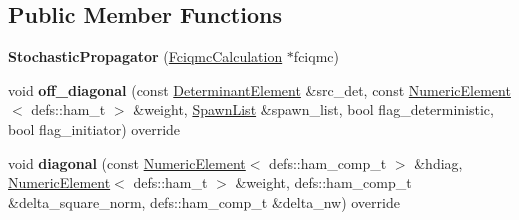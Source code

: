\subsection*{Public Member Functions}
\begin{DoxyCompactItemize}
\item 
{\bfseries Stochastic\+Propagator} (\hyperlink{classFciqmcCalculation}{Fciqmc\+Calculation} $\ast$fciqmc)\hypertarget{classStochasticPropagator_a8e047b2c7790401fba3ceac809c19c45}{}\label{classStochasticPropagator_a8e047b2c7790401fba3ceac809c19c45}

\item 
void {\bfseries off\+\_\+diagonal} (const \hyperlink{classDeterminantElement}{Determinant\+Element} \&src\+\_\+det, const \hyperlink{classNumericElement}{Numeric\+Element}$<$ defs\+::ham\+\_\+t $>$ \&weight, \hyperlink{structSpawnList}{Spawn\+List} \&spawn\+\_\+list, bool flag\+\_\+deterministic, bool flag\+\_\+initiator) override\hypertarget{classStochasticPropagator_ac6e8058f872699d0960ed6264be2511e}{}\label{classStochasticPropagator_ac6e8058f872699d0960ed6264be2511e}

\item 
void {\bfseries diagonal} (const \hyperlink{classNumericElement}{Numeric\+Element}$<$ defs\+::ham\+\_\+comp\+\_\+t $>$ \&hdiag, \hyperlink{classNumericElement}{Numeric\+Element}$<$ defs\+::ham\+\_\+t $>$ \&weight, defs\+::ham\+\_\+comp\+\_\+t \&delta\+\_\+square\+\_\+norm, defs\+::ham\+\_\+comp\+\_\+t \&delta\+\_\+nw) override\hypertarget{classStochasticPropagator_a358272ef0caf2f43520dbbcacca0dbf1}{}\label{classStochasticPropagator_a358272ef0caf2f43520dbbcacca0dbf1}

\end{DoxyCompactItemize}
